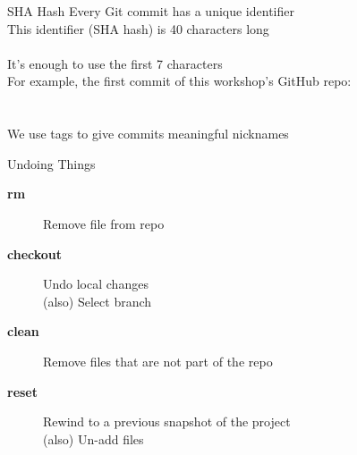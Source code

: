 \documentclass[aspectratio=169]{beamer}
\begin{document}

\begin{frame}{SHA Hash}\small
  Every Git commit has a unique identifier\\[4ex]
  This identifier (SHA hash) is 40 characters long\\[0.5ex]
  \\[4ex]
  It's enough to use the first 7 characters\\[4ex]
  For example, the first commit of this workshop's GitHub repo:\\[1ex]
  \\[0.5ex]
  \\[4ex]
  We use tags to give commits meaningful nicknames
\end{frame}




\begin{frame}{Undoing Things}\small
  \begin{description}
    \item[\bf rm] Remove file from repo \\[5ex]
    \item[\bf checkout] Undo local changes
    \\[1.5ex]
    (also) Select branch\\[5ex]
    \item[\bf clean] Remove files that are not part of the repo
    \\[5ex]
    \item[\bf reset] Rewind to a previous snapshot of the project \\[1.5ex]
    (also) Un-add files\\
  \end{description}
\end{frame}
\end{document}
